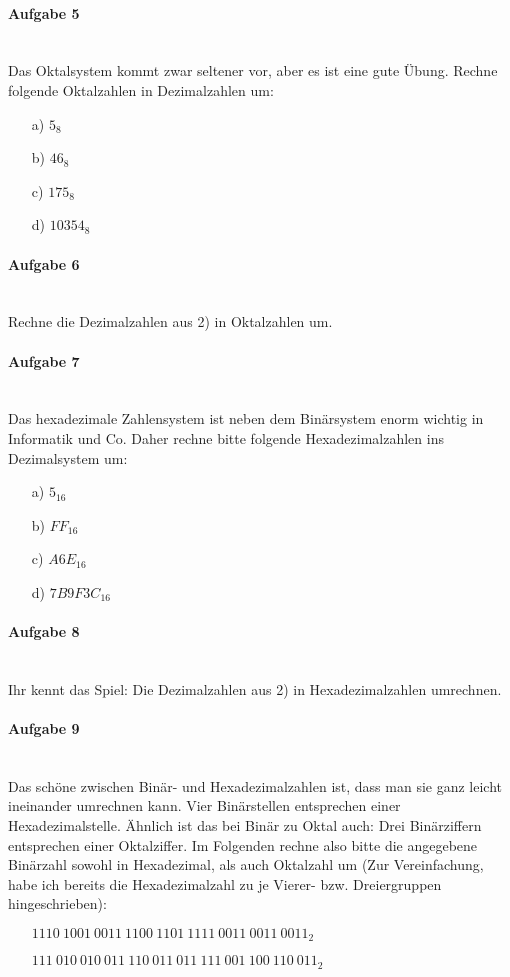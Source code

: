 \documentclass[12pt,a4paper,ngerman]{scrartcl}
\begin{document}
	\paragraph{Aufgabe 5}\mbox{}\\
	Das Oktalsystem kommt zwar seltener vor, aber es ist eine gute Übung. Rechne folgende Oktalzahlen in Dezimalzahlen um:
	\begin{itemize}
		\item[a)] $5_{8}$
		\item[b)] $46_{8}$
		\item[c)] $175_{8}$
		\item[d)] $10354_{8}$
	\end{itemize}

	\paragraph{Aufgabe 6}\mbox{}\\
	Rechne die Dezimalzahlen aus 2) in Oktalzahlen um.
	
	\paragraph{Aufgabe 7}\mbox{}\\
	Das hexadezimale Zahlensystem ist neben dem Binärsystem enorm wichtig in Informatik und Co. Daher rechne bitte folgende Hexadezimalzahlen ins Dezimalsystem um:
	\begin{itemize}
		\item[a)] $5_{16}$
		\item[b)] $FF_{16}$
		\item[c)] $A6E_{16}$
		\item[d)] $7B9F3C_{16}$
	\end{itemize}
	
	\paragraph{Aufgabe 8}\mbox{}\\
	Ihr kennt das Spiel: Die Dezimalzahlen aus 2) in Hexadezimalzahlen umrechnen.
	
	\paragraph{Aufgabe 9}\mbox{}\\
	Das schöne zwischen Binär- und Hexadezimalzahlen ist, dass man sie ganz leicht ineinander umrechnen kann. Vier Binärstellen entsprechen einer Hexadezimalstelle. Ähnlich ist das bei Binär zu Oktal auch: Drei Binärziffern entsprechen einer Oktalziffer. Im Folgenden rechne also bitte die angegebene Binärzahl sowohl in Hexadezimal, als auch Oktalzahl um (Zur Vereinfachung, habe ich bereits die Hexadezimalzahl zu je Vierer- bzw. Dreiergruppen hingeschrieben):
	\begin{itemize}
		\item[] $1110\ 1001\ 0011\ 1100\ 1101\ 1111\ 0011\ 0011\ 0011_{2}$
		\item[] $111\ 010\ 010\ 011\ 110\ 011\ 011\ 111\ 001\ 100\ 110\ 011_{2}$
	\end{itemize}
\end{document}

